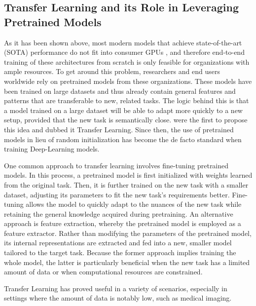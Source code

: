\subsection{Transfer Learning and its Role in Leveraging Pretrained Models}
As it has been shown above, most modern models that achieve state-of-the-art (SOTA) performance do not fit into consumer GPUs , and therefore end-to-end training of these architectures from scratch is only feasible for organizations with ample resources. To get around this problem, researchers and end users worldwide rely on pretrained models from these organizations. These models have been trained on large datasets and thus already contain general features and patterns that are transferable to new, related tasks. The logic behind this is that a model trained on a large dataset will be able to adapt more quickly to a new setup, provided that the new task is semantically close.  were the first to propose this idea and dubbed it Transfer Learning. Since then, the use of pretrained models in lieu of random initialization has become the de facto standard when training Deep-Learning models.

One common approach to transfer learning involves fine-tuning pretrained models. In this process, a pretrained model is first initialized with weights learned from the original task. Then, it is further trained on the new task with a smaller dataset, adjusting its parameters to fit the new task's requirements better. Fine-tuning allows the model to quickly adapt to the nuances of the new task while retaining the general knowledge acquired during pretraining. An alternative approach is feature extraction, whereby the pretrained model is employed as a feature extractor. Rather than modifying the parameters of the pretrained model, its internal representations are extracted and fed into a new, smaller model tailored to the target task. Because the former approach implies training the whole model, the latter is particularly beneficial when the new task has a limited amount of data or when computational resources are constrained.

Transfer Learning has proved useful in a variety of scenarios, especially in settings where the amount of data is notably low, such as medical imaging. 


